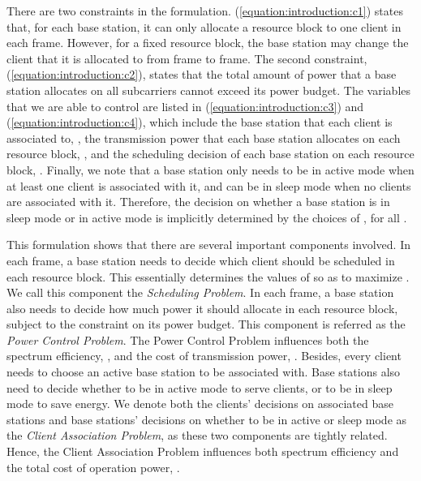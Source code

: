 \documentclass[conference]{IEEEtran}
\begin{document}
There are two constraints in the formulation. (\ref{equation:introduction:c1}) states that, for each base station, it can only allocate a resource block to one client in each frame. However, for a fixed resource block, the base station may change the client that it is allocated to from frame to frame. The second constraint, (\ref{equation:introduction:c2}), states that the total amount of power that a base station allocates on all subcarriers cannot exceed its power budget. The variables that we are able to control are listed in (\ref{equation:introduction:c3}) and (\ref{equation:introduction:c4}), which include the base station that each client is associated to, , the transmission power that each base station allocates on each resource block, , and the scheduling decision of each base station on each resource block, . Finally, we note that a base station only needs to be in active mode when at least one client is associated with it, and can be in sleep mode when no clients are associated with it. Therefore, the decision on whether a base station is in sleep mode or in active mode is implicitly determined by the choices of , for all .


This formulation shows that there are several important components involved. In each frame, a base station needs to decide which client should be scheduled in each resource block. This essentially determines the values of  so as to maximize . We call this component the \emph{Scheduling Problem}. In each frame, a base station also needs to decide how much power it should allocate in each resource block, subject to the constraint on its power budget. This component is referred as the \emph{Power Control Problem}. The Power Control Problem influences both the spectrum efficiency, , and the cost of transmission power, . Besides, every client needs to choose an active base station to be associated with. Base stations also need to decide whether to be in active mode to serve clients, or to be in sleep mode to save energy. We denote both the clients' decisions on associated base stations and base stations' decisions on whether to be in active or sleep mode as the \emph{Client Association Problem}, as these two components are tightly related. Hence, the Client Association Problem influences both spectrum efficiency and the total cost of operation power, .
\end{document}
